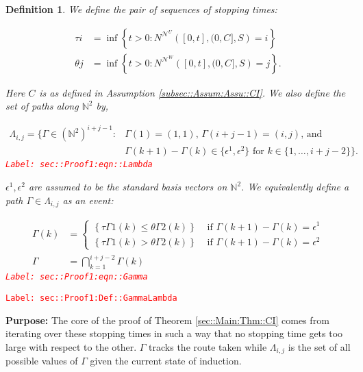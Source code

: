 \documentclass[12pt]{article}
\newcommand{\mb}{\mathbb}
\newcommand{\mc}{\mathcal}
\newcommand{\te}{\text}
\newcommand{\ep}{\epsilon}
\newcommand{\tr}{\textcolor{red}}
\newcommand{\labe}[1]{\tr{\texttt{Label: #1}}}
\newcommand{\purpose}{\textbf{Purpose: }}
\renewcommand{\U}{U}							%
\newcommand{\UU}{W}								%
\renewcommand{\S}{S}							%
\newcommand{\ev}{\ep}							%
\renewcommand{\t}{t}							%
\newcommand{\neigh}{\mc{N}}						%
\newcommand{\vind}[1]{^{#1}}					%
\newcommand{\const}{C}							%
\newcommand{\poiss}{N}							%
\newcommand{\indx}[1]{_{#1}}					%
\newcommand{\rt}{\tau}							%
\newcommand{\rtt}{\theta}						%
\renewcommand{\it}{k}							%
\newcommand{\apath}{\Gamma}						%
\newcommand{\pathset}[2]{\Lambda_{#1,#2}}		%
\newtheorem{defn}[thms]{Definition}
\begin{document}
\begin{defn}
We define the pair of sequences of stopping times:

\begin{align*}
\rt{i} &= \inf \left\{\t > 0: \poiss\vind{\neigh\vind{\U}}\left([0,\t],(0,\const\indx{}],\S\right) = i\right\}\\
\rtt{j} &= \inf \left\{\t > 0: \poiss\vind{\neigh\vind{\UU}}\left([0,\t],(0,\const\indx{}],\S\right) = j\right\}.
\end{align*}

Here \(\const\indx{}\) is as defined in Assumption \ref{subsec::Assum:Assu::CI}. We also define the set of paths along \(\mb{N}^2\) by,

\begin{align}
\pathset{i}{j} = \{\apath{} \in (\mb{N}^2)^{i+j-1}: &\apath{}(1) = (1,1)\te{, } \apath{}(i+j-1) = (i,j)\te{, and } \nonumber\\
&\apath{}(\it+1) - \apath{}(\it)\in \{\ev\vind{1},\ev\vind{2}\}\te{ for }\it\in \{1,\dots, i+j-2\}\}.
\label{sec::Proof1:eqn::Lambda}
\end{align}
\labe{sec::Proof1:eqn::Lambda}

\(\ev\vind{1},\ev\vind{2}\) are assumed to be the standard basis vectors on \(\mb{N}^2\). We equivalently define a path \(\apath{} \in \pathset{i}{j}\) as an event:

\begin{align}
\apath{}(\it) &= \begin{cases}
\left\{\rt{\apath{1}(\it)} \leq \rtt{\apath{2}(\it)}\right\} &\te{ if } \apath{}(\it+1) - \apath{}(\it) = \ev\vind{1}\\
\left\{\rt{\apath{1}(\it)} > \rtt{\apath{2}(\it)}\right\} &\te{ if } \apath{}(\it+1) - \apath{}(\it) = \ev\vind{2}
\end{cases}\\
\apath{} &= \bigcap_{\it=1}^{i+j-2} \apath{}(\it)
\label{sec::Proof1:eqn::Gamma}
\end{align}
\labe{sec::Proof1:eqn::Gamma}
\label{sec::Proof1:Def::GammaLambda}
\end{defn}
\labe{sec::Proof1:Def::GammaLambda}

\purpose The core of the proof of Theorem \ref{sec::Main:Thm::CI} comes from iterating over these stopping times in such a way that no stopping time gets too large with respect to the other. \(\apath{}\) tracks the route taken while \(\pathset{i}{j}\) is the set of all possible values of \(\apath{}\) given the current state of induction.
\end{document}
